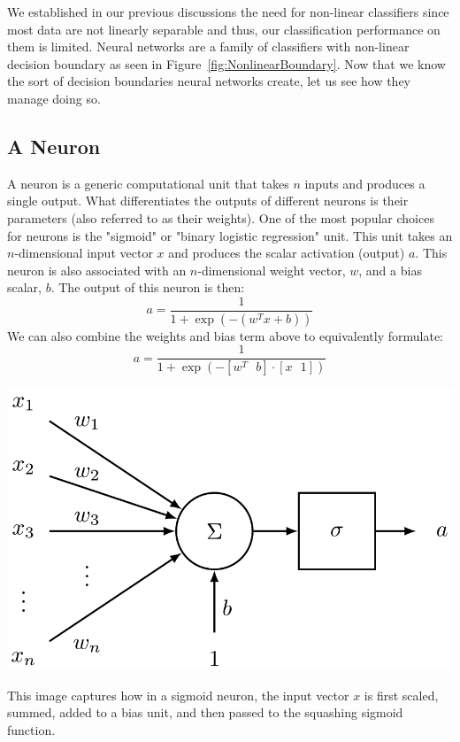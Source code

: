\documentclass{tufte-handout}
\begin{document}

We established in our previous discussions the need for non-linear classifiers since most data are not linearly separable and thus, our classification performance on them is limited. Neural networks are a family of classifiers with non-linear decision boundary as seen in Figure~\ref{fig:NonlinearBoundary}. Now that we know the sort of decision boundaries neural networks create, let us see how they manage doing so.

\subsection{A Neuron}\label{sec:neuron}

A neuron is a generic computational unit that takes $n$ inputs and produces a single output. What differentiates the outputs of different neurons is their parameters (also referred to as their weights). One of the most popular choices for neurons is the "sigmoid" or "binary logistic regression" unit. This unit takes an $n$-dimensional input vector $x$ and produces the scalar activation (output) $a$. This neuron is also associated with an $n$-dimensional weight vector, $w$, and a bias scalar, $b$. The output of this neuron is then:
$$ a = \frac{1}{1 + \exp(-(w^Tx + b))}$$
We can also combine the weights and bias term above to equivalently formulate:
$$ a = \frac{1}{1 + \exp(-[w^T~~~b] \cdot[x~~~1])}$$

\begin{marginfigure}%
  \includegraphics[width=\linewidth]{sigmoidneuron}
  \caption{This image captures how in a sigmoid neuron, the input vector $x$ is first scaled, summed, added to a bias unit, and then passed to the squashing sigmoid function.}
  \label{fig:sigmoidneuron}
\end{marginfigure}
\end{document}
